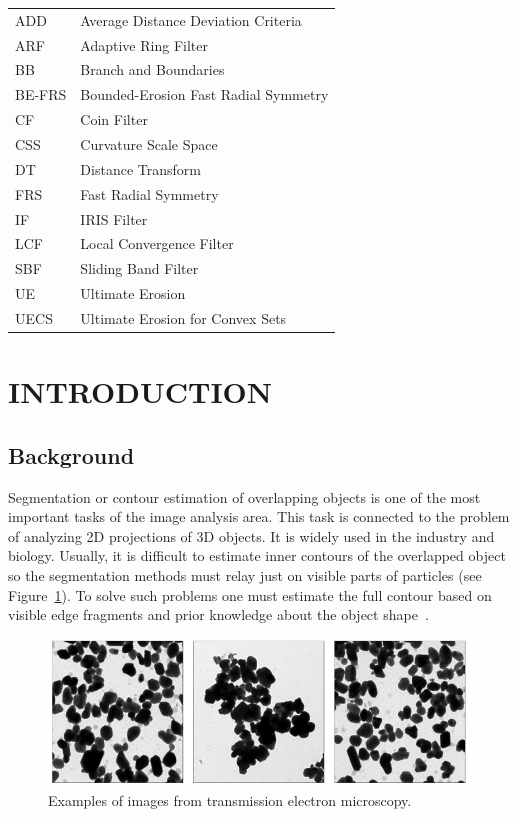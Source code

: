 \documentclass{lutmscthesis}[2010/09/22]
\begin{document}
\begin{tabular}{l l}
ADD &  Average Distance Deviation Criteria\\
ARF & Adaptive Ring Filter\\
BB & Branch and Boundaries\\
BE-FRS & Bounded-Erosion Fast Radial Symmetry\\
CF & Coin Filter\\
CSS & Curvature Scale Space \\
DT & Distance Transform \\
FRS & Fast Radial Symmetry \\
IF & IRIS Filter\\
LCF & Local Convergence Filter\\
SBF & Sliding Band Filter\\
UE & Ultimate Erosion\\
UECS & Ultimate Erosion for Convex Sets\\
\end{tabular}



\setlength{\parskip}{3ex}



\section{INTRODUCTION}
\label{sec:introduction}

\subsection{Background}
\label{sec:background}

Segmentation or contour estimation of overlapping objects is one of the most important tasks of the image analysis area. This task is connected to the problem of analyzing 2D projections of 3D objects. It is widely used in the industry and biology. Usually, it is difficult to estimate inner contours of the overlapped object so the segmentation methods must relay just on visible parts of particles (see Figure~\ref{fig:real_data}). To solve such problems one must estimate the full contour based on visible edge fragments and prior knowledge about the object shape~\cite{zafari-thesis}.

\begin{figure}[ht]
  \includegraphics[width=\linewidth]{real_data.png}
  \caption{Examples of images from transmission electron microscopy.}
  \label{fig:real_data}
\end{figure}
\end{document}
